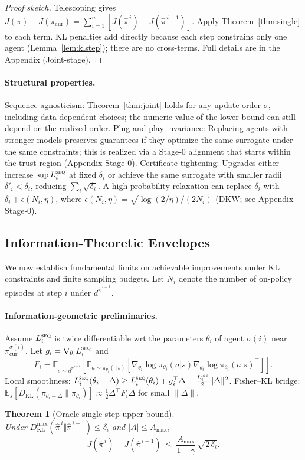 \documentclass[sigconf]{aamas}
\newtheorem{theorem}{Theorem}[section]
\newcommand{\E}{\mathbb{E}}
\newcommand{\KL}{D_{\mathrm{KL}}}
\begin{document}
\begin{proof}[Proof sketch]
Telescoping gives $J(\bar\pi)-J(\pi_{\mathrm{cur}})=\sum_{i=1}^{n}[J(\hat\pi^{\,i})-J(\hat\pi^{\,i-1})]$. Apply Theorem~\ref{thm:single} to each term. KL penalties add directly because each step constrains only one agent (Lemma~\ref{lem:klstep}); there are no cross-terms. Full details are in the Appendix (Joint-stage).
\end{proof}

\paragraph{Structural properties.}
Sequence-agnosticism: Theorem~\ref{thm:joint} holds for any update order $\sigma$, including data-dependent choices; the numeric value of the lower bound can still depend on the realized order.
Plug-and-play invariance: Replacing agents with stronger models preserves guarantees if they optimize the same surrogate under the same constraints; this is realized via a Stage‑0 alignment that starts within the trust region (Appendix Stage‑0).
Certificate tightening: Upgrades either increase $\sup L_i^{\textsc{seq}}$ at fixed $\delta_i$ or achieve the same surrogate with smaller radii $\delta'_i<\delta_i$, reducing $\sum_i\sqrt{\delta_i}$. A high-probability relaxation can replace $\delta_i$ with $\delta_i+\epsilon(N_i,\eta)$, where
$\epsilon(N_i,\eta)=\sqrt{\log(2/\eta)/(2N_i)}$ (DKW; see Appendix Stage‑0).

\subsection{Information-Theoretic Envelopes}
\label{subsec:info-envelopes}

We now establish fundamental limits on achievable improvements under KL constraints and finite sampling budgets. Let $N_i$ denote the number of on-policy episodes at step $i$ under $d^{\hat\pi^{\,i-1}}$.

\paragraph{Information-geometric preliminaries.}
Assume $L_i^{\textsc{seq}}$ is twice differentiable wrt the parameters $\theta_i$ of agent $\sigma(i)$ near $\pi^{\sigma(i)}_{\mathrm{cur}}$. Let $g_i = \nabla_{\theta_i} L_i^{\textsc{seq}}$ and
\[
F_i = \E_{s \sim d^{\hat\pi^{\,i-1}}}\left[\E_{a \sim \pi_{\theta_i}(\cdot|s)}\left[\nabla_{\theta_i}\log\pi_{\theta_i}(a|s)\nabla_{\theta_i}\log\pi_{\theta_i}(a|s)^\top\right]\right].
\]
Local smoothness: $L_i^{\textsc{seq}}(\theta_i+\Delta) \ge L_i^{\textsc{seq}}(\theta_i) + g_i^\top\Delta - \frac{L_i^{\mathrm{loc}}}{2}\|\Delta\|^2$.
Fisher–KL bridge: $\E_{s}[\KL(\pi_{\theta_i+\Delta}\|\pi_{\theta_i})]\approx \frac{1}{2}\Delta^\top F_i \Delta$ for small $\|\Delta\|$.
\begin{theorem}[Oracle single-step upper bound]
\label{thm:oracle-upper}
\mbox{}\\
Under $\KL^{\max}(\hat\pi^{\,i}\Vert\hat\pi^{\,i-1}) \le \delta_i$ and $|A|\le A_{\max}$,
\[
J(\hat\pi^{\,i})-J(\hat\pi^{\,i-1})
\ \le\ \frac{A_{\max}}{1-\gamma}\,\sqrt{2\,\delta_i}.
\]
\end{theorem}
\end{document}
